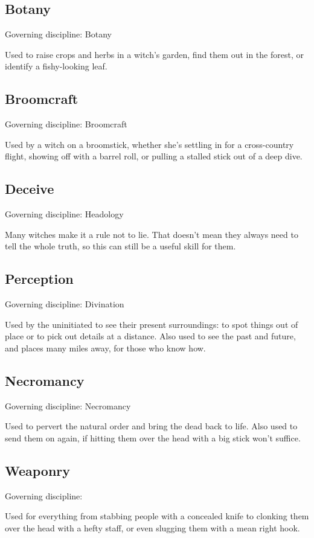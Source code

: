 \newcommand\govdisc[1]{Governing discipline: #1} %

\subsection{Botany}
\govdisc{Botany}

Used to raise crops and herbs in a witch's garden, find them out in the forest, or identify a fishy-looking leaf.

\subsection{Broomcraft}
\govdisc{Broomcraft}

Used by a witch on a broomstick, whether she's settling in for a cross-country flight, showing off with a barrel roll, or pulling a stalled stick out of a deep dive.

\subsection{Deceive}
\govdisc{Headology} %

Many witches make it a rule not to lie.
That doesn't mean they always need to tell the whole truth, so this can still be a useful skill for them.

\subsection{Perception}
\govdisc{Divination}

Used by the uninitiated to see their present surroundings: to spot things out of place or to pick out details at a distance.
Also used to see the past and future, and places many miles away, for those who know how.

\subsection{Necromancy}
\govdisc{Necromancy}

Used to pervert the natural order and bring the dead back to life.
Also used to send them on again, if hitting them over the head with a big stick won't suffice.

\subsection{Weaponry}
\govdisc{} %

Used for everything from stabbing people with a concealed knife to clonking them over the head with a hefty staff, or even slugging them with a mean right hook.
